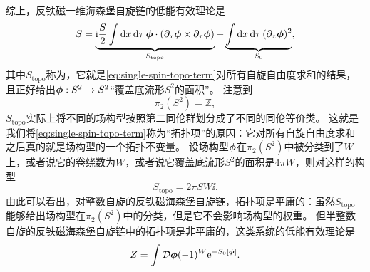 综上，反铁磁一维海森堡自旋链的低能有效理论是
\begin{equation}
    S = \underbrace{\mathrm{i} \frac{S}{2} \int \dd{x} \dd{\tau} \vb*{\phi} \cdot (\partial_x \vb*{\phi} \times \partial_\tau \vb*{\phi})}_{S_\text{topo}} + \underbrace{\int \dd{x} \dd{\tau} (\partial_x \vb*{\phi})^2}_{S_0},
\end{equation}
其中$S_\text{topo}$称为，它就是\eqref{eq:single-spin-topo-term}对所有自旋自由度求和的结果，且正好给出$\vb*{\phi}: S^2 \to S^2$“覆盖底流形$S^2$的面积”。
注意到
\[
    \pi_2(S^2) = \mathbb{Z},
\]
$S_\text{topo}$实际上将不同的场构型按照第二同伦群划分成了不同的同伦等价类。
这就是我们将\eqref{eq:single-spin-topo-term}称为“拓扑项”的原因：它对所有自旋自由度求和之后真的就是场构型的一个拓扑不变量。
设场构型$\vb*{\phi}$在$\pi_2(S^2)$中被分类到了$W$上，或者说它的卷绕数为$W$，或者说它覆盖底流形$S^2$的面积是$4 \pi W$，则对这样的构型
\begin{equation}
    S_\text{topo} = 2 \pi S W \ii.
\end{equation}
由此可以看出，对整数自旋的反铁磁海森堡自旋链，拓扑项是平庸的：虽然$S_\text{topo}$能够给出场构型在$\pi_2(S^2)$中的分类，但是它不会影响场构型的权重。
但半整数自旋的反铁磁海森堡自旋链中的拓扑项是非平庸的，这类系统的低能有效理论是
\begin{equation}
    Z = \int \mathcal{D} \vb*{\phi} (-1)^W \mathrm{e}^{- S_0[\vb*{\phi}]}.
\end{equation}

